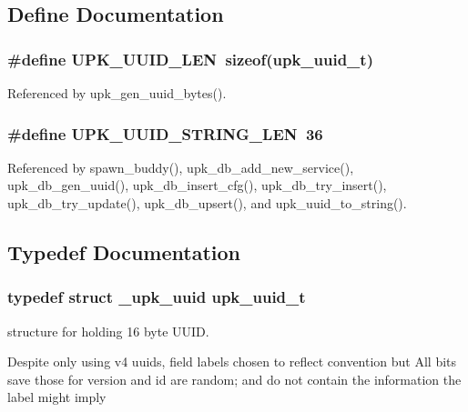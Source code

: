 \subsection{Define Documentation}
\subsubsection[{UPK\_\-UUID\_\-LEN}]{\setlength{\rightskip}{0pt plus 5cm}\#define UPK\_\-UUID\_\-LEN~sizeof({\bf upk\_\-uuid\_\-t})}\label{group__uuid_ga5c492b948c7c6a74289b75ef6dee5f8b}


Referenced by upk\_\-gen\_\-uuid\_\-bytes().

\subsubsection[{UPK\_\-UUID\_\-STRING\_\-LEN}]{\setlength{\rightskip}{0pt plus 5cm}\#define UPK\_\-UUID\_\-STRING\_\-LEN~36}\label{group__uuid_ga4e7d198c8257d81f92ec7d4c1d6e7cb5}


Referenced by spawn\_\-buddy(), upk\_\-db\_\-add\_\-new\_\-service(), upk\_\-db\_\-gen\_\-uuid(), upk\_\-db\_\-insert\_\-cfg(), upk\_\-db\_\-try\_\-insert(), upk\_\-db\_\-try\_\-update(), upk\_\-db\_\-upsert(), and upk\_\-uuid\_\-to\_\-string().



\subsection{Typedef Documentation}
\subsubsection[{upk\_\-uuid\_\-t}]{\setlength{\rightskip}{0pt plus 5cm}typedef struct {\bf \_\-upk\_\-uuid}  {\bf upk\_\-uuid\_\-t}}\label{group__uuid_gad592133cddb5acf4c36149653d128496}


structure for holding 16 byte UUID. 

Despite only using v4 uuids, field labels chosen to reflect convention but All bits save those for version and id are random; and do not contain the information the label might imply 